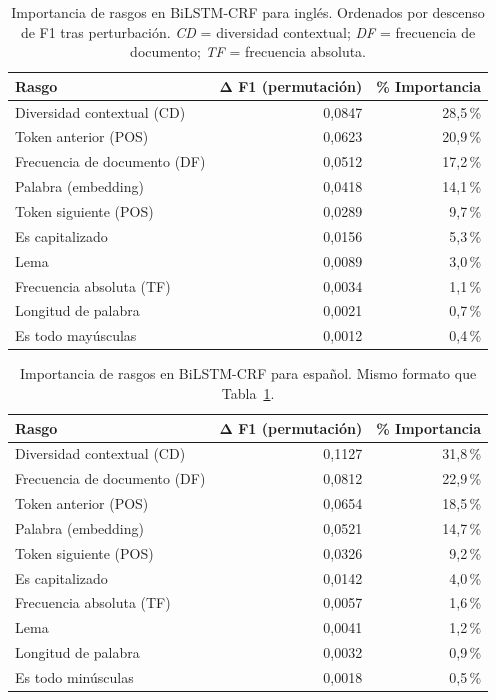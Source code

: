 \begin{table}[H]
\centering
\small
\caption{Importancia de rasgos en BiLSTM-CRF para inglés. Ordenados por descenso de F1 tras perturbación. \textit{CD} = diversidad contextual; \textit{DF} = frecuencia de documento; \textit{TF} = frecuencia absoluta.}
\label{tab:bio_importancia_en}
\begin{tabular}{@{} l r r @{}}
\toprule
\textbf{Rasgo} & \textbf{Δ F1 (permutación)} & \textbf{\% Importancia} \\
\midrule
Diversidad contextual (CD) & 0{,}0847 & 28{,}5\,\% \\
Token anterior (POS) & 0{,}0623 & 20{,}9\,\% \\
Frecuencia de documento (DF) & 0{,}0512 & 17{,}2\,\% \\
Palabra (embedding) & 0{,}0418 & 14{,}1\,\% \\
Token siguiente (POS) & 0{,}0289 & 9{,}7\,\% \\
Es capitalizado & 0{,}0156 & 5{,}3\,\% \\
Lema & 0{,}0089 & 3{,}0\,\% \\
Frecuencia absoluta (TF) & 0{,}0034 & 1{,}1\,\% \\
Longitud de palabra & 0{,}0021 & 0{,}7\,\% \\
Es todo mayúsculas & 0{,}0012 & 0{,}4\,\% \\
\bottomrule
\end{tabular}
\end{table}

\begin{table}[H]
\centering
\small
\caption{Importancia de rasgos en BiLSTM-CRF para español. Mismo formato que Tabla~\ref{tab:bio_importancia_en}.}
\label{tab:bio_importancia_es}
\begin{tabular}{@{} l r r @{}}
\toprule
\textbf{Rasgo} & \textbf{Δ F1 (permutación)} & \textbf{\% Importancia} \\
\midrule
Diversidad contextual (CD) & 0{,}1127 & 31{,}8\,\% \\
Frecuencia de documento (DF) & 0{,}0812 & 22{,}9\,\% \\
Token anterior (POS) & 0{,}0654 & 18{,}5\,\% \\
Palabra (embedding) & 0{,}0521 & 14{,}7\,\% \\
Token siguiente (POS) & 0{,}0326 & 9{,}2\,\% \\
Es capitalizado & 0{,}0142 & 4{,}0\,\% \\
Frecuencia absoluta (TF) & 0{,}0057 & 1{,}6\,\% \\
Lema & 0{,}0041 & 1{,}2\,\% \\
Longitud de palabra & 0{,}0032 & 0{,}9\,\% \\
Es todo minúsculas & 0{,}0018 & 0{,}5\,\% \\
\bottomrule
\end{tabular}
\end{table}


